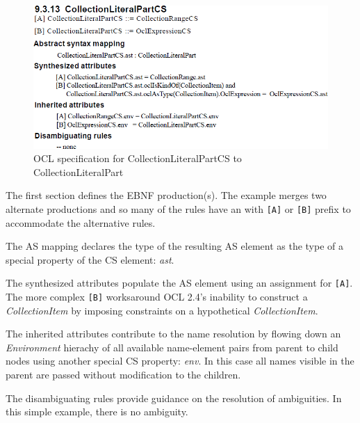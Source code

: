 \documentclass{llncs}
\begin{document}
\begin{figure}[htbp]
	\centering
	\includegraphics[scale=0.45]{images/CollectionLiteralPartOMG.png}
	\caption{OCL specification for CollectionLiteralPartCS to CollectionLiteralPart}
	\label{fig:CollectionLiteralPartOMG}
\end{figure}



The first section defines the EBNF production(s). The example merges two alternate productions and so many of the rules have an with \verb$[A]$ or \verb$[B]$ prefix to accommodate the alternative rules.

The AS mapping declares the type of the resulting AS element as the type of a special property of the CS element: \emph{ast}.

The synthesized attributes populate the AS element using an assignment for \verb$[A]$. The more complex \verb$[B]$ worksaround OCL 2.4's inability to construct a  \emph{CollectionItem} by imposing constraints on a hypothetical \emph{CollectionItem}.

The inherited attributes contribute to the name resolution by flowing down an \textit{Environment} hierachy of all available name-element pairs from parent to child nodes using another special CS property: \emph{env}. In this case all names visible in the parent are passed without modification to the children.

The disambiguating rules provide guidance on the resolution of ambiguities. In this simple example, there is no ambiguity.
\end{document}
